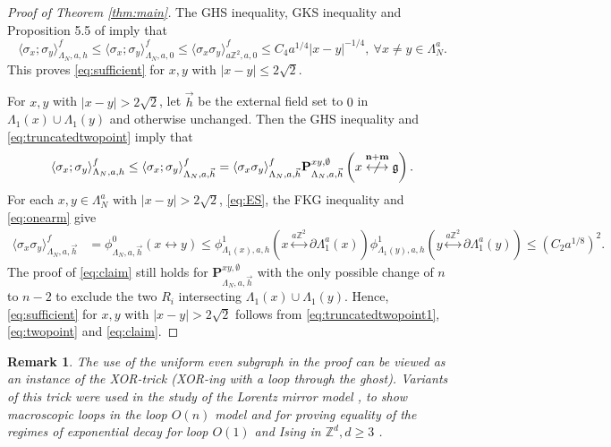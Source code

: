 \documentclass[article,12pt,reqno]{amsart}
\newtheorem{remark}[theorem]{Remark}
\begin{document}
\begin{proof}[Proof of Theorem \ref{thm:main}]
    The GHS inequality, GKS inequality \cite{Gri67,KS68} and Proposition 5.5 of \cite{DCHN11} imply that
	\begin{equation}\label{eq:shortdistance}
		\langle \sigma_x; \sigma_y \rangle_{\Lambda_N,a,h}^f \leq \langle \sigma_x; \sigma_y \rangle_{\Lambda_N,a,0}^f\leq \langle \sigma_x \sigma_y \rangle_{a\mathbb{Z}^2,a,0}^f\leq C_4 a^{1/4}|x-y|^{-1/4},~\forall x\neq y\in \Lambda_N^a.
	\end{equation}
	 This proves \eqref{eq:sufficient} for $x,y$ with $|x-y|\leq 2\sqrt{2}$.

  For $x,y$ with $|x-y|> 2\sqrt{2}$, let $\vec{h}$ be the external field set to $0$ in $\Lambda_1(x)\cup\Lambda_1(y)$ and otherwise unchanged. Then the GHS inequality and \eqref{eq:truncatedtwopoint} imply that
	\begin{equation}\label{eq:truncatedtwopoint1}
		\langle \sigma_x; \sigma_y \rangle_{\Lambda_N, a,h}^f \leq \langle \sigma_x; \sigma_y \rangle_{\Lambda_N, a,\vec{h}}^f = \langle \sigma_x \sigma_y \rangle_{\Lambda_N,a,\vec{h}}^f \mathbf{P}^{xy,\emptyset}_{\Lambda_N,a,\vec{h}}\left(x \overset{{\bf n} +{\bf m}} {\centernot \longleftrightarrow} \mathfrak{g}\right).
	\end{equation}
	For each $x,y\in \Lambda_N^a \text{ with }|x-y|>2\sqrt{2}$,  \eqref{eq:ES}, the FKG inequality and \eqref{eq:onearm} give
	\begin{align}\label{eq:twopoint}
		\langle \sigma_x \sigma_y \rangle_{\Lambda_N,a,\vec{h}}^f&=\phi^0_{\Lambda_N,a,\vec{h}}(x\longleftrightarrow y)\leq \phi_{\Lambda_{1}(x),a,h}^1(x\overset{a\mathbb{Z}^2}{\longleftrightarrow} \partial \Lambda_{1}^a(x))\phi_{\Lambda_{1}(y),a,h}^1(y\overset{a\mathbb{Z}^2}{\longleftrightarrow} \partial \Lambda_{1}^a(y))
		\leq (C_2a^{1/8})^2.
	\end{align}
	The proof of \eqref{eq:claim} still holds for $\mathbf{P}^{xy,\emptyset}_{\Lambda_N,a,\vec{h}}$ with the only possible change of $n$ to $n-2$ to exclude the two $R_i$ intersecting $\Lambda_1(x)\cup\Lambda_1(y)$.
    Hence, \eqref{eq:sufficient} for $x,y$ with $|x-y|>2\sqrt{2}$ follows from \eqref{eq:truncatedtwopoint1}, \eqref{eq:twopoint} and \eqref{eq:claim}.
\end{proof}


\begin{remark}
    The use of the uniform even subgraph in the proof can be viewed as an instance of the XOR-trick (XOR-ing with a loop through the ghost). Variants of this trick were used in the study of the Lorentz mirror model \cite{kozma2013mirror}, to show macroscopic loops in the loop $O(n)$ model \cite{crawford2025macroscopic} and for proving equality of the regimes of exponential decay for loop $O(1)$ and Ising in $\mathbb{Z}^d, d \geq 3$ \cite{hansen2025uniform}. 
\end{remark}
\end{document}
